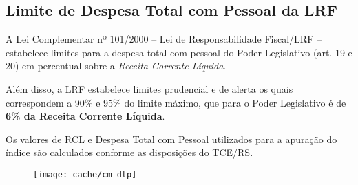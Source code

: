 
\subsection[Despesa Total com Pessoal]{Limite de Despesa Total com Pessoal da LRF}

A Lei Complementar nº 101/2000 – Lei de Responsabilidade Fiscal/LRF – estabelece limites para a despesa total com pessoal do Poder Legislativo (art. 19 e 20) em percentual sobre a \textit{Receita Corrente Líquida}.

Além disso, a LRF estabelece limites prudencial e de alerta os quais correspondem a 90\% e 95\% do limite máximo, que para o Poder Legislativo é de \textbf{6\% da Receita Corrente Líquida}.



Os valores de RCL e Despesa Total com Pessoal utilizados para a apuração do índice são calculados conforme as disposições do TCE/RS.

\begin{figure}[H]
\center
\texttt{[image: cache/cm\_dtp]}
\end{figure}


